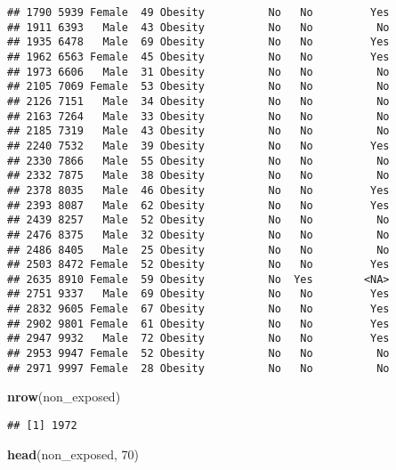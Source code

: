 \documentclass[
]{article}
\newenvironment{Shaded}{\begin{snugshade}}{\end{snugshade}}
\newcommand{\DecValTok}[1]{\textcolor[rgb]{0.00,0.00,0.81}{#1}}
\newcommand{\FunctionTok}[1]{\textcolor[rgb]{0.13,0.29,0.53}{\textbf{#1}}}
\newcommand{\NormalTok}[1]{#1}
\begin{document}
\begin{verbatim}
## 1790 5939 Female  49 Obesity          No   No         Yes
## 1911 6393   Male  43 Obesity          No   No          No
## 1935 6478   Male  69 Obesity          No   No         Yes
## 1962 6563 Female  45 Obesity          No   No         Yes
## 1973 6606   Male  31 Obesity          No   No          No
## 2105 7069 Female  53 Obesity          No   No          No
## 2126 7151   Male  34 Obesity          No   No          No
## 2163 7264   Male  33 Obesity          No   No          No
## 2185 7319   Male  43 Obesity          No   No          No
## 2240 7532   Male  39 Obesity          No   No         Yes
## 2330 7866   Male  55 Obesity          No   No          No
## 2332 7875   Male  38 Obesity          No   No          No
## 2378 8035   Male  46 Obesity          No   No         Yes
## 2393 8087   Male  62 Obesity          No   No         Yes
## 2439 8257   Male  52 Obesity          No   No          No
## 2476 8375   Male  32 Obesity          No   No          No
## 2486 8405   Male  25 Obesity          No   No          No
## 2503 8472 Female  52 Obesity          No   No         Yes
## 2635 8910 Female  59 Obesity          No  Yes        <NA>
## 2751 9337   Male  69 Obesity          No   No         Yes
## 2832 9605 Female  67 Obesity          No   No         Yes
## 2902 9801 Female  61 Obesity          No   No         Yes
## 2947 9932   Male  72 Obesity          No   No         Yes
## 2953 9947 Female  52 Obesity          No   No          No
## 2971 9997 Female  28 Obesity          No   No          No
\end{verbatim}

\begin{Shaded}
\begin{Highlighting}[]
\FunctionTok{nrow}\NormalTok{(non\_exposed)}
\end{Highlighting}
\end{Shaded}

\begin{verbatim}
## [1] 1972
\end{verbatim}

\begin{Shaded}
\begin{Highlighting}[]
\FunctionTok{head}\NormalTok{(non\_exposed, }\DecValTok{70}\NormalTok{)}
\end{Highlighting}
\end{Shaded}
\end{document}
